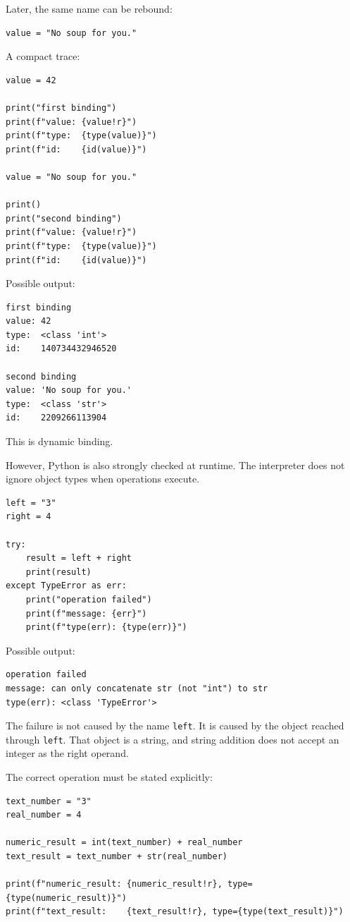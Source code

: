 Later, the same name can be rebound:

\begin{verbatim}
value = "No soup for you."
\end{verbatim}

A compact trace:

\begin{verbatim}
value = 42

print("first binding")
print(f"value: {value!r}")
print(f"type:  {type(value)}")
print(f"id:    {id(value)}")

value = "No soup for you."

print()
print("second binding")
print(f"value: {value!r}")
print(f"type:  {type(value)}")
print(f"id:    {id(value)}")
\end{verbatim}

Possible output:

\begin{verbatim}
first binding
value: 42
type:  <class 'int'>
id:    140734432946520

second binding
value: 'No soup for you.'
type:  <class 'str'>
id:    2209266113904
\end{verbatim}

This is dynamic binding.

However, Python is also strongly checked at runtime. The interpreter does not ignore object types when operations execute.

\begin{verbatim}
left = "3"
right = 4

try:
    result = left + right
    print(result)
except TypeError as err:
    print("operation failed")
    print(f"message: {err}")
    print(f"type(err): {type(err)}")
\end{verbatim}

Possible output:

\begin{verbatim}
operation failed
message: can only concatenate str (not "int") to str
type(err): <class 'TypeError'>
\end{verbatim}

The failure is not caused by the name \texttt{left}. It is caused by the object reached through \texttt{left}. That object is a string, and string addition does not accept an integer as the right operand.

The correct operation must be stated explicitly:

\begin{verbatim}
text_number = "3"
real_number = 4

numeric_result = int(text_number) + real_number
text_result = text_number + str(real_number)

print(f"numeric_result: {numeric_result!r}, type={type(numeric_result)}")
print(f"text_result:    {text_result!r}, type={type(text_result)}")
\end{verbatim}

